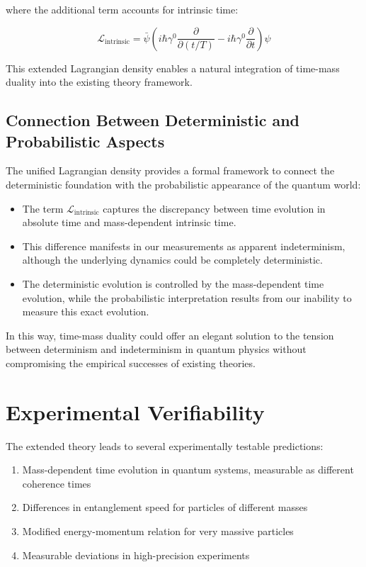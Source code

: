 \documentclass[12pt,a4paper]{article}  %
\begin{document}
	where the additional term accounts for intrinsic time:
	
	\begin{equation}
		\mathcal{L}_\text{intrinsic} = \bar{\psi}\left(i\hbar\gamma^0 \frac{\partial}{\partial (t/T)} - i\hbar\gamma^0 \frac{\partial}{\partial t}\right)\psi
	\end{equation}
	
	This extended Lagrangian density enables a natural integration of time-mass duality into the existing theory framework.
	
	\subsection{Connection Between Deterministic and Probabilistic Aspects}
	
	The unified Lagrangian density provides a formal framework to connect the deterministic foundation with the probabilistic appearance of the quantum world:
	
	\begin{itemize}
		\item The term $\mathcal{L}_\text{intrinsic}$ captures the discrepancy between time evolution in absolute time and mass-dependent intrinsic time.
		
		\item This difference manifests in our measurements as apparent indeterminism, although the underlying dynamics could be completely deterministic.
		
		\item The deterministic evolution is controlled by the mass-dependent time evolution, while the probabilistic interpretation results from our inability to measure this exact evolution.
	\end{itemize}
	
	In this way, time-mass duality could offer an elegant solution to the tension between determinism and indeterminism in quantum physics without compromising the empirical successes of existing theories.
	
	\section{Experimental Verifiability}
	
	The extended theory leads to several experimentally testable predictions:
	
	\begin{enumerate}
		\item Mass-dependent time evolution in quantum systems, measurable as different coherence times
		\item Differences in entanglement speed for particles of different masses
		\item Modified energy-momentum relation for very massive particles
		\item Measurable deviations in high-precision experiments
	\end{enumerate}
	
\end{document}

